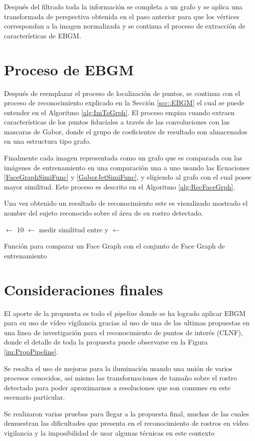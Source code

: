 Después del filtrado toda la información se completa a un grafo y se aplica una transformada de perspectiva obtenida en el paso anterior para que los vértices correspondan a la imagen normalizada y se continua el proceso de extracción de características de \ac{EBGM}.{}

\section{Proceso de \ac{EBGM}}
Después de reemplazar el proceso de localización de puntos, se continua con el proceso de reconocimiento explicado en la Sección \ref{scc::EBGM} el cual se puede entender en el Algoritmo \ref{alg:ImToGrph}. El proceso empiza cuando extraen características de los puntos fiduciales a través de las convoluciones con las mascaras de Gabor, donde el grupo de coeficientes de resultado son almacenados en una estructura tipo grafo.

Finalmente cada imagen representada como un grafo que es comparada con las imágenes de entrenamiento en una comparación una a uno usando las Ecuaciones \ref{FaceGraphSimiFunc} y \ref{GaborJetSimiFunc}, y eligiendo al grafo con el cual posee mayor similitud. Este proceso es descrito en el Algoritmo \ref{alg:RecFaceGrph}.

Una vez obtenido un resultado de reconocimiento este es visualizado mostrado el nombre del sujeto reconocido sobre el área de su rostro detectado.

\begin{algorithm}
\;
 $\gets$ 10\;
{
	 $\gets$ medir similitud entre  y \;
    {
    	 $\gets$ \;
    }
}
\;
\caption{Función para comparar un Face Graph con el conjunto de Face Graph de entrenamiento}
\label{alg:RecFaceGrph}
\end{algorithm}

\section{Consideraciones finales}
El aporte de la propuesta es todo el \textit{pipeline} donde se ha logrado aplicar \ac{EBGM} para su uso de vídeo vigilancia gracias al uso de una de las ultimas propuestas en una linea de investigación para el reconocimiento de puntos de interés (\ac{CLNF}), donde el detalle de toda la propuesta puede observarse en la Figura \ref{im:PropPipeline}. 

Se resalta el uso de mejoras para la iluminación usando una unión de varios procesos conocidos, así mismo las transformaciones de tamaño sobre el rostro detectado para poder aproximarnos a resoluciones que son comunes en este escenario particular.

Se realizaron varias pruebas para llegar a la propuesta final, muchas de las cuales demuestran las dificultades que presenta en el reconocimiento de rostros en vídeo vigilancia y la imposibilidad de usar algunas técnicas en este contexto
